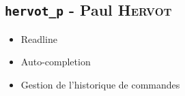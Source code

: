 \subsection{\texttt{hervot\_p} - Paul \textsc{Hervot}}

\begin{itemize}
    \item Readline
    \item Auto-completion
    \item Gestion de l'historique de commandes
\end{itemize}
